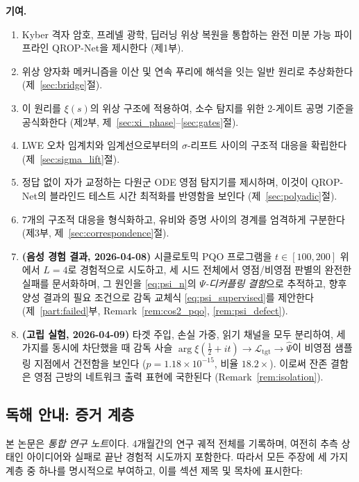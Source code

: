 \documentclass[11pt, a4paper]{article}
\theoremstyle{definition}
\theoremstyle{plain}
\newcommand{\xif}{\xi}
\newcommand{\Psip}{\Psi}
\begin{document}
\textbf{기여.}
\begin{enumerate}
  \item Kyber 격자 암호, 프레넬 광학, 딥러닝 위상 복원을 통합하는 완전 미분 가능 파이프라인 QROP-Net을 제시한다 (제1부).
  \item 위상 양자화 메커니즘을 이산 및 연속 푸리에 해석을 잇는 일반 원리로 추상화한다 (제~\ref{sec:bridge}절).
  \item 이 원리를 $\xif(s)$의 위상 구조에 적용하여, 소수 탐지를 위한 2-게이트 공명 기준을 공식화한다 (제2부, 제~\ref{sec:xi_phase}--\ref{sec:gates}절).
  \item LWE 오차 임계치와 임계선으로부터의 $\sigma$-리프트 사이의 구조적 대응을 확립한다 (제~\ref{sec:sigma_lift}절).
  \item 정답 없이 자가 교정하는 다원군 ODE 영점 탐지기를 제시하며, 이것이 QROP-Net의 블라인드 테스트 시간 최적화를 반영함을 보인다 (제~\ref{sec:polyadic}절).
  \item 7개의 구조적 대응을 형식화하고, 유비와 증명 사이의 경계를 엄격하게 구분한다 (제3부, 제~\ref{sec:correspondence}절).
  \item \textbf{(음성 경험 결과, 2026-04-08)} 시클로토믹 PQO 프로그램을 $t \in [100, 200]$ 위에서 $L=4$로 경험적으로 시도하고, 세 시드 전체에서 영점/비영점 판별의 완전한 실패를 문서화하며, 그 원인을 \cref{eq:psi_n}의 \emph{$\Psip$-디커플링 결함}으로 추적하고, 향후 양성 결과의 필요 조건으로 감독 교체식 \cref{eq:psi_supervised}를 제안한다 (제~\ref{part:failed}부, Remark~\ref{rem:cos2_pqo}, \ref{rem:psi_defect}).
  \item \textbf{(고립 실험, 2026-04-09)} 타겟 주입, 손실 가중, 읽기 채널을 모두 분리하여, 세 가지를 동시에 차단했을 때 감독 사슬 $\arg\xif(\tfrac{1}{2}+it)\to\mathcal{L}_{\mathrm{tgt}}\to\hat\Psip$이 비영점 샘플링 지점에서 건전함을 보인다 ($p=1.18\times10^{-15}$, 비율 $18.2\times$). 이로써 잔존 결함은 영점 근방의 네트워크 출력 표현에 국한된다 (Remark~\ref{rem:isolation}).
\end{enumerate}

\subsection*{독해 안내: 증거 계층}
\label{sec:tiers}

\noindent 본 논문은 \emph{통합 연구 노트}이다. 4개월간의 연구 궤적 전체를 기록하며, 여전히 추측 상태인 아이디어와 실패로 끝난 경험적 시도까지 포함한다. 따라서 모든 주장에 세 가지 계층 중 하나를 명시적으로 부여하고, 이를 섹션 제목 및 목차에 표시한다:
\end{document}
